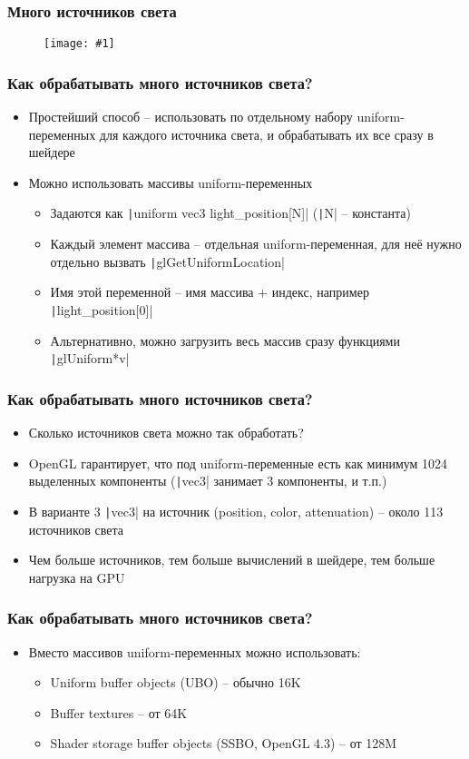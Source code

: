 \documentclass[10pt]{beamer}
\newcommand{\slideimage}[1]{
  \begin{figure}
    \begin{adjustbox}{width=\textwidth, totalheight=\textheight-2\baselineskip-2\baselineskip,keepaspectratio}
      \texttt{[image: \#1]}
    \end{adjustbox}
  \end{figure}
}
\begin{document}
\begin{frame}[fragile]
\frametitle{Много источников света}
\slideimage{many-lights.png}
\end{frame}

\begin{frame}[fragile]
\frametitle{Как обрабатывать много источников света?}
\begin{itemize}
\item Простейший способ -- использовать по отдельному набору uniform-переменных для каждого источника света, и обрабатывать их все сразу в шейдере
\pause
\item Можно использовать массивы uniform-переменных
\pause
\begin{itemize}
\item Задаются как \texttt|uniform vec3 light_position[N]| (\texttt|N| -- константа)
\item Каждый элемент массива -- отдельная uniform-переменная, для неё нужно отдельно вызвать \texttt|glGetUniformLocation|
\item Имя этой переменной -- имя массива + индекс, например \texttt|light_position[0]|
\item Альтернативно, можно загрузить весь массив сразу функциями \texttt|glUniform*v|
\end{itemize}
\end{itemize}
\end{frame}

\begin{frame}[fragile]
\frametitle{Как обрабатывать много источников света?}
\begin{itemize}
\item Сколько источников света можно так обработать?
\pause
\item OpenGL гарантирует, что под uniform-переменные есть как минимум 1024 выделенных компоненты (\texttt|vec3| занимает 3 компоненты, и т.п.)
\pause
\item В варианте 3 \texttt|vec3| на источник (position, color, attenuation) -- около 113 источников света
\pause
\item Чем больше источников, тем больше вычислений в шейдере, тем больше нагрузка на GPU
\end{itemize}
\end{frame}

\begin{frame}[fragile]
\frametitle{Как обрабатывать много источников света?}
\begin{itemize}
\item Вместо массивов uniform-переменных можно использовать:
\begin{itemize}
\item Uniform buffer objects (UBO) -- обычно 16K
\item Buffer textures -- от 64K
\item Shader storage buffer objects (SSBO, OpenGL 4.3) -- от 128M
\end{itemize}
\end{itemize}
\end{frame}
\end{document}
